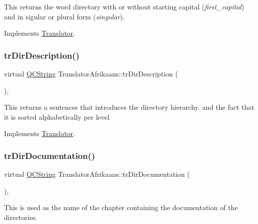 This returns the word directory with or without starting capital ({\itshape first\+\_\+capital}) and in sigular or plural form ({\itshape singular}). 

Implements \mbox{\hyperlink{class_translator}{Translator}}.

\mbox{\label{class_translator_afrikaans_a64d111152dedb16ef5993f5b1c17718a}} 
\subsubsection{\texorpdfstring{trDirDescription()}{trDirDescription()}}
{\footnotesize\ttfamily virtual \mbox{\hyperlink{class_q_c_string}{Q\+C\+String}} Translator\+Afrikaans\+::tr\+Dir\+Description (\begin{DoxyParamCaption}{ }\end{DoxyParamCaption})\hspace{0.3cm}{\ttfamily [inline]}, {\ttfamily [virtual]}}

This returns a sentences that introduces the directory hierarchy. and the fact that it is sorted alphabetically per level 

Implements \mbox{\hyperlink{class_translator}{Translator}}.

\mbox{\label{class_translator_afrikaans_a2cc94044d48d42bbdcfc30ff82d7fc6d}} 
\subsubsection{\texorpdfstring{trDirDocumentation()}{trDirDocumentation()}}
{\footnotesize\ttfamily virtual \mbox{\hyperlink{class_q_c_string}{Q\+C\+String}} Translator\+Afrikaans\+::tr\+Dir\+Documentation (\begin{DoxyParamCaption}{ }\end{DoxyParamCaption})\hspace{0.3cm}{\ttfamily [inline]}, {\ttfamily [virtual]}}

This is used as the name of the chapter containing the documentation of the directories. 

